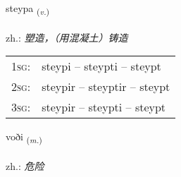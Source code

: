 \documentclass[frontgrid, backgrid]{flacards}\usepackage[]{graphicx}\usepackage[]{xcolor}
\begin{document}
\renewcommand{\flhead}{\vskip5pt \fboxsep=0pt {\small\bfseries\footnotesize Sagnorð | 动词}}
\renewcommand{\fcfoot}{\vskip5pt \fboxsep=0pt \hspace{2pt}{\small\bfseries\footnotesize 3K}}

\renewcommand{\blhead}{\vskip5pt {\small\bfseries\footnotesize Sagnorð | 动词 }}
\renewcommand{\bcfoot}{\vskip5pt \hspace{2pt}{\small\bfseries\footnotesize 3K}}


{steypa \small{\textsubscript{(\textit{v.})}} \\[1ex] %
\textphonetic{[steiːpa]} \\
zh.: \emph{塑造，（用混凝土）铸造} \\  [2ex]
\renewcommand*{\arraystretch}{0.8}
\begin{tabular}{p{1cm}l}
\textsc{1sg}: & steypi -- steypti -- steypt \\ 
\textsc{2sg}: & steypir -- steyptir -- steypt \\ 
\textsc{3sg}: & steypir -- steypti -- steypt \\ 
\end{tabular}
}

\renewcommand{\flhead}{\vskip5pt \fboxsep=0pt {\small\bfseries\footnotesize Nafnorð | 名词}}
\renewcommand{\fcfoot}{\vskip5pt \fboxsep=0pt \hspace{2pt}{\small\bfseries\footnotesize 3K}}

\renewcommand{\blhead}{\vskip5pt {\small\bfseries\footnotesize Nafnorð | 名词 }}
\renewcommand{\bcfoot}{\vskip5pt \hspace{2pt}{\small\bfseries\footnotesize 3K}}


{voði \small{\textsubscript{(\textit{m.})}} \\[1ex] %
\textphonetic{[vɔːðɪ]} \\
zh.: \emph{危险} \\  [2ex]
\renewcommand*{\arraystretch}{0.8}
}
\end{document}
